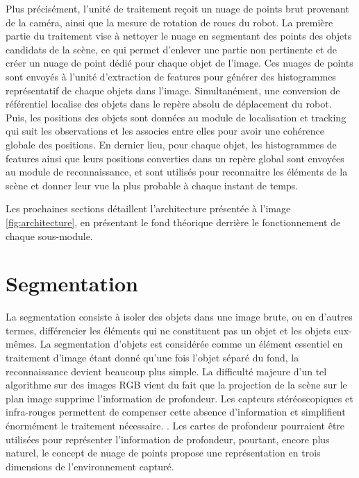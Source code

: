 Plus précisément, l'unité de traitement reçoit un nuage de points brut provenant de la caméra, ainsi que la mesure de rotation de roues du robot. La première partie du traitement vise à nettoyer le nuage en segmentant des points des objets candidats de la scène, ce qui permet d'enlever une partie non pertinente et de créer un nuage de point dédié pour chaque objet de l'image. Ces nuages de points sont envoyés à l'unité d'extraction de features pour générer des histogrammes représentatif de chaque objets dans l'image. Simultanément, une conversion de référentiel localise des objets dans le repère absolu de déplacement du robot. Puis, les positions des objets sont données au module de localisation et tracking qui suit les observations et les associes entre elles pour avoir une cohérence globale des positions. En dernier lieu, pour chaque objet, les histogrammes de features ainsi que leurs positions converties dans un repère global sont envoyées au module de reconnaissance, et sont utilisés pour reconnaitre les éléments de la scène et donner leur vue la plus probable à chaque instant de temps. 

Les prochaines sections détaillent l'architecture présentée à l'image \ref{fig:architecture}, en présentant le fond théorique derrière le fonctionnement de chaque sous-module.

\section{Segmentation}

La segmentation consiste à isoler des objets dans une image brute, ou en d'autres termes, différencier les éléments qui ne constituent pas un objet et les objets eux-mêmes. La segmentation d'objets est considérée comme un élément essentiel en traitement d'image étant donné qu'une fois l'objet séparé du fond, la reconnaissance devient beaucoup plus simple. La difficulté majeure d'un tel algorithme sur des images RGB vient du fait que la projection de la scène sur le plan image supprime l'information de profondeur. Les capteurs stéréoscopiques et infra-rouges permettent de compenser cette absence d'information et simplifient énormément le traitement nécessaire. . Les cartes de profondeur pourraient être utilisées pour représenter l'information de profondeur, pourtant, encore plus naturel, le concept de nuage de points propose une représentation en trois dimensions de l'environnement capturé.

